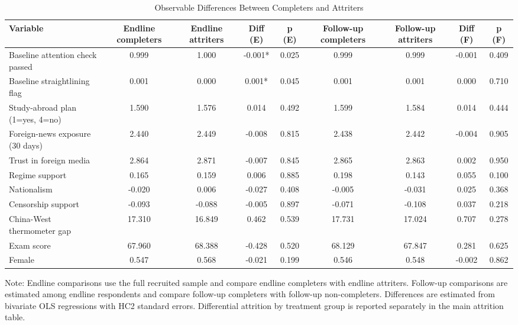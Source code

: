 \begin{table}[H]
\centering
\caption{Observable Differences Between Completers and Attriters}
\label{tab:attrition_composition}
\footnotesize
\begin{threeparttable}
\begin{tabular}{lcccccccc}
\toprule
Variable & Endline completers & Endline attriters & Diff (E) & p (E) & Follow-up completers & Follow-up attriters & Diff (F) & p (F) \\
\midrule
Baseline attention check passed & 0.999 & 1.000 & -0.001* & 0.025 & 0.999 & 0.999 & -0.001 & 0.409 \\
Baseline straightlining flag & 0.001 & 0.000 & 0.001* & 0.045 & 0.001 & 0.001 & 0.000 & 0.710 \\
Study-abroad plan (1=yes, 4=no) & 1.590 & 1.576 & 0.014 & 0.492 & 1.599 & 1.584 & 0.014 & 0.444 \\
Foreign-news exposure (30 days) & 2.440 & 2.449 & -0.008 & 0.815 & 2.438 & 2.442 & -0.004 & 0.905 \\
Trust in foreign media & 2.864 & 2.871 & -0.007 & 0.845 & 2.865 & 2.863 & 0.002 & 0.950 \\
Regime support & 0.165 & 0.159 & 0.006 & 0.885 & 0.198 & 0.143 & 0.055 & 0.100 \\
Nationalism & -0.020 & 0.006 & -0.027 & 0.408 & -0.005 & -0.031 & 0.025 & 0.368 \\
Censorship support & -0.093 & -0.088 & -0.005 & 0.897 & -0.071 & -0.108 & 0.037 & 0.218 \\
China-West thermometer gap & 17.310 & 16.849 & 0.462 & 0.539 & 17.731 & 17.024 & 0.707 & 0.278 \\
Exam score & 67.960 & 68.388 & -0.428 & 0.520 & 68.129 & 67.847 & 0.281 & 0.625 \\
Female & 0.547 & 0.568 & -0.021 & 0.199 & 0.546 & 0.548 & -0.002 & 0.862 \\
\bottomrule
\end{tabular}
\begin{tablenotes}[flushleft]
\footnotesize
\item Note: Endline comparisons use the full recruited sample and compare endline completers with endline attriters. Follow-up comparisons are estimated among endline respondents and compare follow-up completers with follow-up non-completers. Differences are estimated from bivariate OLS regressions with HC2 standard errors. Differential attrition by treatment group is reported separately in the main attrition table.
\end{tablenotes}
\end{threeparttable}
\end{table}
